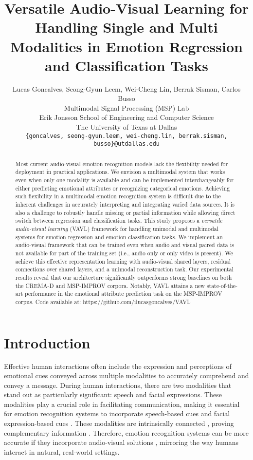 \documentclass{article}
\title{Versatile Audio-Visual Learning for Handling Single and Multi Modalities in Emotion Regression and Classification Tasks}
\author{
  Lucas Goncalves, Seong-Gyun Leem, Wei-Cheng
Lin, Berrak Sisman, Carlos Busso \\
  Multimodal Signal Processing (MSP) Lab \\
  Erik Jonsson School of Engineering and Computer Science \\
  The University of Texas at Dallas\\
  \texttt{\{goncalves, seong-gyun.leem, wei-cheng.lin, berrak.sisman, busso\}@utdallas.edu} \\
}
\begin{document}
\maketitle


\begin{abstract}
Most current audio-visual emotion recognition models lack the flexibility needed for deployment in practical applications. We envision a multimodal system that works even when only one modality is available and can be implemented interchangeably for either predicting emotional attributes or recognizing categorical emotions. Achieving such flexibility in a multimodal emotion recognition system is difficult due to the inherent challenges in accurately interpreting and integrating varied data sources. It is also a challenge to robustly handle missing or partial information while allowing direct switch between regression and classification tasks. This study proposes a \emph{versatile audio-visual learning} (VAVL) framework for handling unimodal and multimodal systems for emotion regression and emotion classification tasks. We implement an audio-visual framework that can be trained even when audio and visual paired data is not available for part of the training set (i.e., audio only or only video is present). We achieve this effective representation learning with audio-visual shared layers, residual connections over shared layers, and a unimodal reconstruction task. Our experimental results reveal that our architecture significantly outperforms strong baselines on both the CREMA-D and MSP-IMPROV corpora. Notably, VAVL attains a new state-of-the-art performance in the emotional attribute prediction task on the MSP-IMPROV corpus. Code available at: https://github.com/ilucasgoncalves/VAVL
\end{abstract}




\section{Introduction}
\label{sec:introduction}








Effective human interactions often include the expression and perceptions of emotional cues conveyed across multiple modalities to accurately comprehend and convey a message. During human interactions, there are two modalities that stand out as particularly significant: speech and facial expressions. These modalities play a crucial role in facilitating communication, making it essential for emotion recognition systems to incorporate speech-based cues \cite{Busso_2013,Schuller_2018} and facial expression-based cues \cite{Salman_2020_2,Tian_2001,Mariooryad_2016}. These modalities are intrinsically connected \cite{Busso_2006}, proving complementary information \cite{Busso_2004}. Therefore, emotion recognition systems can be more accurate if they incorporate audio-visual solutions \cite{DMello_2015}, mirroring the way humans interact in natural, real-world settings.
\end{document}
